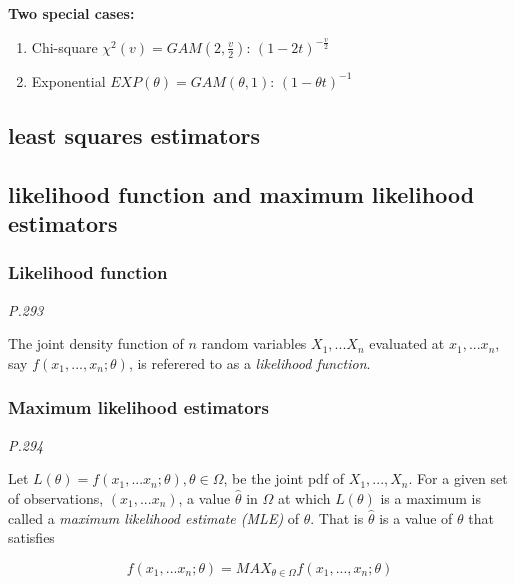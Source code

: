 \documentclass[]{book}
\begin{document}
\textbf{Two special cases:}

\begin{enumerate}
\def\labelenumi{(\arabic{enumi})}
\setcounter{enumi}{5}
\item
  Chi-square \(\chi^2(v) =GAM(2,\frac{v}{2})\): \((1-2t)^{-\frac{v}{2}}\)
\item
  Exponential \(EXP(\theta)=GAM(\theta,1)\): \((1-\theta t)^{-1}\)
\end{enumerate}

\hypertarget{least-squares-estimators}{%
\subsection{least squares estimators}\label{least-squares-estimators}}

\hypertarget{likelihood-function-and-maximum-likelihood-estimators}{%
\subsection{likelihood function and maximum likelihood estimators}\label{likelihood-function-and-maximum-likelihood-estimators}}

\hypertarget{likelihood-function}{%
\subsubsection{Likelihood function}\label{likelihood-function}}

\emph{P.293}

The joint density function of \(n\) random variables \(X_1,...X_n\) evaluated at \(x_1, ...x_n\), say \(f(x_1,...,x_n; \theta)\), is referered to as a \emph{likelihood function}.

\hypertarget{maximum-likelihood-estimators}{%
\subsubsection{Maximum likelihood estimators}\label{maximum-likelihood-estimators}}

\emph{P.294}

Let \(L(\theta)=f(x_1,...x_n; \theta), \theta \in \Omega\), be the joint pdf of \(X_1, ..., X_n\). For a given set of observations, \((x_1,...x_n)\), a value \(\hat{\theta}\) in \(\Omega\) at which \(L(\theta)\) is a maximum is called a \emph{maximum likelihood estimate (MLE)} of \(\theta\). That is \(\hat{\theta}\) is a value of \(\theta\) that satisfies

\[f(x_1,...x_n; \theta)=MAX_{\theta \in \Omega} f(x_1, ..., x_n; \theta)\]
\end{document}
